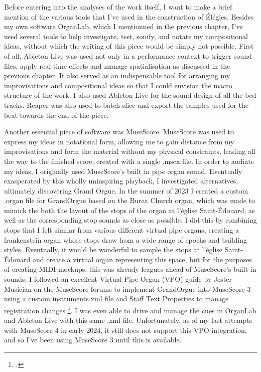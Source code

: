 \documentclass[12pt,twoside,maitrise]{dms_ks}
\theoremstyle{definition}
\begin{document}
{Before entering into the analyses of the work itself, I want to make a brief mention of the various tools that I've used in the construction of Élégies. 
Besides my own software OrganLab, which I mentionned in the previous chapter, I've used several tools to help investigate, test, sonify, and notate my compositional ideas, without which the writing of this piece would be simply not possible. 
First of all, Ableton Live was used not only in a performance context to trigger sound files, apply real-time effects and manage spatialisation as discussed in the previous chapter. 
It also served as an indispensable tool for arranging my improvisations and compositional ideas so that I could envision the macro structure of the work. 
I also used Ableton Live for the sound design of all the bed tracks. 
Reaper was also used to batch slice and export the samples used for the beat towards the end of the piece.

Another essential piece of software was MuseScore. 
MuseScore was used to express my ideas in notational form, allowing me to gain distance from my improvisations and form the material without my physical constraints, leading all the way to the finished score, created with a single .mscx file. 
In order to audiate my ideas, I originally used MuseScore's built in pipe organ sound. 
Eventually exasperated by this wholly uninspiring playback, I investigated alternatives, ultimately discovering Grand Orgue. 
In the summer of 2023 I created a custom .organ file for GrandOrgue based on the Burea Church organ, which was made to mimick the both the layout of the stops of the organ at l'église Saint-Édouard, as well as the corresponding stop sounds as close as possible. 
I did this by combining stops that I felt similar from various different virtual pipe organs, creating a frankenstein organ whose stops draw from a wide range of epochs and building styles. 
Eventually, it would be wonderful to sample the stops at l'église Saint-Édouard and create a virtual organ representing this space, but for the purposes of creating MIDI mockups, this was already leagues ahead of MuseScore's built in sounds. 
I followed an excellent Virtual Pipe Organ (VPO) guide by Jester Musician on the MuseScore forums to implement GrandOrgue into MuseScore 3 using a custom instruments.xml file and Staff Text Properties to manage registration changes \footcite{musician_jester_how_2018}. 
I was even able to drive and manage the cues in OrganLab and Ableton Live with this same .xml file. 
Unfortunately, as of my last attempts with MuseScore 4 in early 2024, it still does not support this VPO integration, and so I've been using MuseScore 3 until this is available.

}
\end{document}
